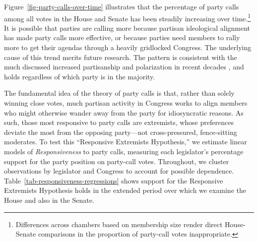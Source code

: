 \documentclass[12pt]{article}
\begin{document}
Figure~\ref{fig-party-calls-over-time} illustrates that the percentage of party calls among all votes in the House and Senate has been steadily increasing over time.\footnote{\doublespacing\normalsize
Differences across chambers based on membership size render
direct House-Senate comparisons in the proportion of party-call votes
inappropriate.
}  It is possible that parties are calling more because partisan ideological alignment has made party calls more effective, or because parties need members to rally more to get their agendas through a heavily gridlocked Congress.  The underlying cause of this trend merits future research.  The pattern is consistent with the much discussed increased partisanship and polarization in recent decades \citep[e.g.,][]{Aldrich:2000, Lee:2009, Lee:2016, Theriault:2013, Smith:2014}, and holds regardless of which party is in the majority.


The fundamental idea of the theory of party calls is that, rather than solely winning close votes, much partisan activity in Congress works to align members who might otherwise wander away from the party for idiosyncratic reasons.  As such, those most responsive to party calls are extremists, whose preferences deviate the most from the opposing party---not cross-pressured, fence-sitting moderates.  To test this ``Responsive Extremists Hypothesis,'' we estimate linear models of \textit{Responsiveness} to party calls, measuring each legislator's percentage support for the party position on party-call votes.  Throughout, we cluster observations by legislator and Congress to account for possible dependence.  Table~\ref{tab-responsiveness-regressions} shows support for the Responsive Extremists Hypothesis holds in the extended period over which we examine the House and also in the Senate.
\end{document}
